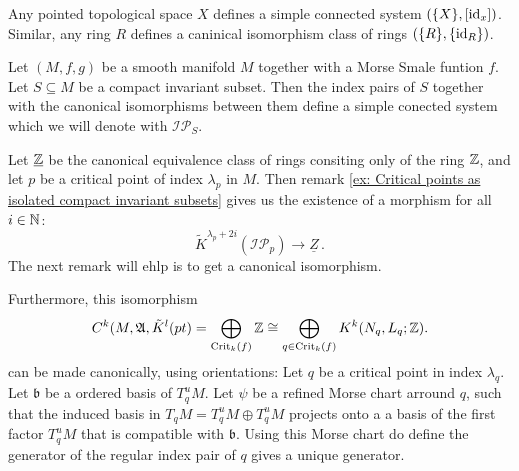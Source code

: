 \begin{example}
	Any pointed topological space $X$ defines a simple connected system $(\{X\},{[\operatorname{\mathrm{id}}_x]})$. Similar, any ring $R$ defines a caninical isomorphism class of rings $(\{R\},\{\operatorname{\mathrm{id}}_R\})$.
\end{example}
\begin{definition}
	Let $(M,f,g)$ be a smooth manifold $M$ together with a Morse Smale funtion $f$. Let $S\subseteq M$ be a compact invariant subset. Then the index pairs of $S$ together with the canonical isomorphisms between them define a simple conected system which we will denote with $\mathcal{IP}_S$.   
\end{definition}
\begin{remark}
	Let $\underline{\mathbb{Z}}$ be the canonical equivalence class of rings consiting only of the ring $\mathbb{Z}$, and let $p$ be a critical point of index $\lambda_p$ in $M$. Then remark \ref{ex: Critical points as isolated compact invariant subsets} gives us the existence of a morphism for all $i\in \mathbb{N}$:
	\begin{equation*}
		\tilde{K}^{\lambda_p+2i}(\mathcal{IP}_p)\to \underline{Z}\,.
	\end{equation*} The next remark will ehlp is to get a canonical isomorphism.
\end{remark}
\begin{remark}
		Furthermore, this isomorphism 
		\begin{equation} \label{ kritical points as direct sum of homology groups}
			C^{k}(M,\mathfrak{A},\tilde{K}^{l}(pt)=\bigoplus_{ \mathrm{Crit}_k(f)} \mathbb{Z} \cong \bigoplus_{q\in \mathrm{Crit}_k(f)} K^k(N_q,L_q;\mathbb{Z}).
		\end{equation}
		can be made canonically, using orientations: Let $q$ be a critical point in index $\lambda_q$. Let $\mathfrak{b}$ be a ordered basis of $T^u_qM$. Let $\psi$ be a refined Morse chart arround $q$, such that the induced basis in $T_qM=T^u_qM\oplus T^u_qM$ projects onto a a basis of the first factor $T^u_qM$ that is compatible with $\mathfrak{b}$. Using this Morse chart do define the generator of the regular index pair of $q$ gives a unique generator.
\end{remark}
